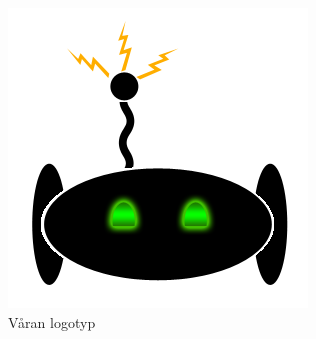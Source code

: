 \documentclass[a4paper,12pt,fleqn]{article}
\begin{document}
\begin{figure}[htp] %
  \begin{center}
  \includegraphics[keepaspectratio=true,scale=0.8]{logotyp}  %
  \end{center}
  \caption{Våran logotyp} %
\end{figure}
\end{document}
